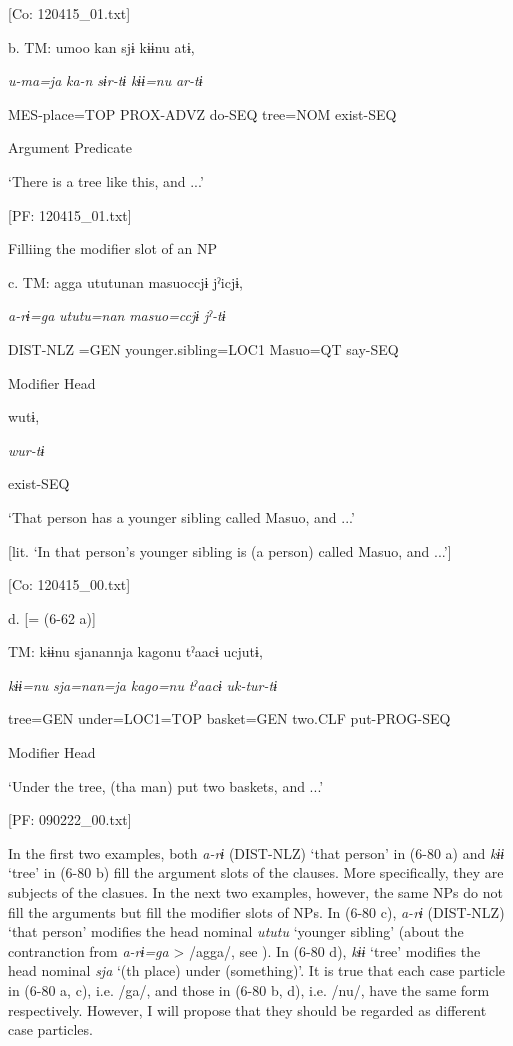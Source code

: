       [Co: 120415\_01.txt]

  b.  TM:  umoo  kan  sjɨ  kɨɨnu  atɨ,

      \textit{u-ma=ja}  \textit{ka-n}  \textit{sɨr-tɨ}  \textit{kɨɨ=nu}  \textit{ar-tɨ}

      MES-place=TOP  PROX-ADVZ  do-SEQ  tree=NOM  exist-SEQ

            Argument  Predicate

      ‘There is a tree like this, and ...’

      [PF: 120415\_01.txt]

  Filliing the modifier slot of an NP

  c.  TM:  agga  ututunan  masuoccjɨ  jˀicjɨ,

      \textit{a-rɨ=ga}  \textit{ututu=nan}  \textit{masuo=ccjɨ}  \textit{jˀ-tɨ}

      DIST-NLZ =GEN  younger.sibling=LOC1  Masuo=QT  say-SEQ

      Modifier  Head    

      wutɨ,

      \textit{wur-tɨ}

      exist-SEQ

      ‘That person has a younger sibling called Masuo, and ...’

[lit. ‘In that person’s younger sibling is (a person) called Masuo, and ...’]

      [Co: 120415\_00.txt]

  d.  [= (6-62 a)]

    TM:  kɨɨnu  sjanannja  kagonu  tˀaacɨ  ucjutɨ,

      \textit{kɨɨ=nu}  \textit{sja=nan=ja}  \textit{kago=nu}  \textit{tˀaacɨ}  \textit{uk-tur-tɨ}

      tree=GEN  under=LOC1=TOP  basket=GEN  two.CLF  put-PROG-SEQ

      Modifier  Head      

      ‘Under the tree, (tha man) put two baskets, and ...’

      [PF: 090222\_00.txt]

In the first two examples, both \textit{a-rɨ} (DIST-NLZ) ‘that person’ in (6-80 a) and \textit{kɨɨ} ‘tree’ in (6-80 b) fill the argument slots of the clauses. More specifically, they are subjects of the clasues. In the next two examples, however, the same NPs do not fill the arguments but fill the modifier slots of NPs. In (6-80 c), \textit{a-rɨ} (DIST-NLZ) ‘that person’ modifies the head nominal \textit{ututu} ‘younger sibling’ (about the contranction from \textit{a-rɨ=ga} > /agga/, see ). In (6-80 d), \textit{kɨɨ} ‘tree’ modifies the head nominal \textit{sja} ‘(th place) under (something)’. It is true that each case particle in (6-80 a, c), i.e. /ga/, and those in (6-80 b, d), i.e. /nu/, have the same form respectively. However, I will propose that they should be regarded as different case particles.

